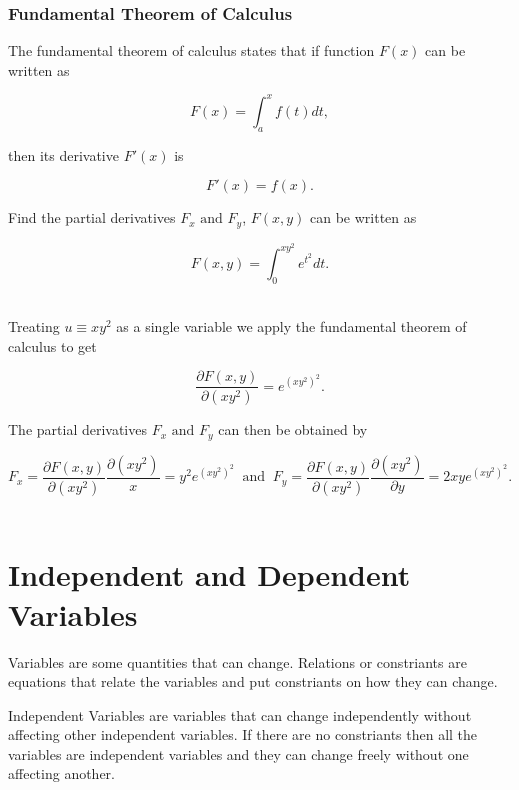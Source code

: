 \documentclass[english,a4paper,12pt]{report}
\begin{document}
\subsubsection{Fundamental Theorem of Calculus}

The fundamental theorem of calculus states that if function \(F(x)\) can be written as  

\begin{equation}
	F(x) = \int_{a}^{x} f(t)dt,  
\end{equation}

then its derivative \(F'(x)\) is 

\begin{equation}
	F'(x) = f(x).
\end{equation}

{Find the partial derivatives \(F_{x} \text { and } F_{y} \), \(F(x,y)\) can be written as 

\begin{equation}
	F(x,y) = \int_{0}^{xy^2} e^{t^2} dt.  
\end{equation}
~
}
{Treating \(u \equiv xy^2\) as a single variable we apply the fundamental theorem of calculus to get 

\begin{equation}
	\frac{\partial F(x,y)}{\partial (xy^2)} = e^{(xy^2)^2}.  
\end{equation}

The partial derivatives \(F_{x} \text { and } F_{y}  \) can then be obtained by 

\begin{equation}
	F_{x} =  \frac{\partial F(x,y)}{\partial (xy^2)} \frac{\partial (xy^2)}{x} = y^2e^{(xy^2)^2} ~\text { and }~ F_{y} = \frac{\partial F(x,y)}{\partial (xy^2)} \frac{\partial (xy^2)}{\partial y} = 2xye^{(xy^2)^2}.     
\end{equation}
~
} 



\section{Independent and Dependent Variables}

Variables are some quantities that can change. Relations or constriants are equations that relate the variables and put constriants on how they can change. 

Independent Variables are variables that can change independently without affecting other independent variables. If there are no constriants then all the variables are independent variables and they can change freely without one affecting another.
\end{document}
